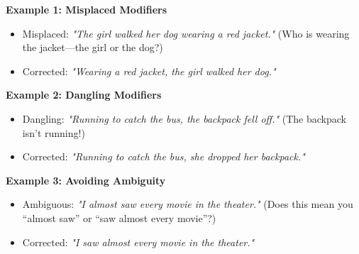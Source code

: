 \documentclass[12pt]{article}
\begin{document}
\begin{tcolorbox}[colframe=black!60, colback=white, 
coltitle=black, colbacktitle=black!15, fonttitle=\bfseries\Large, 
title=Examples, halign title=center, left=10pt, right=10pt, top=10pt, bottom=15pt]

\textbf{Example 1: Misplaced Modifiers}
\begin{itemize}
    \item Misplaced: \textit{"The girl walked her dog wearing a red jacket."}  
    (Who is wearing the jacket—the girl or the dog?)
    \item Corrected: \textit{"Wearing a red jacket, the girl walked her dog."}
\end{itemize}

\textbf{Example 2: Dangling Modifiers}
\begin{itemize}
    \item Dangling: \textit{"Running to catch the bus, the backpack fell off."}  
    (The backpack isn’t running!)
    \item Corrected: \textit{"Running to catch the bus, she dropped her backpack."}
\end{itemize}

\textbf{Example 3: Avoiding Ambiguity}
\begin{itemize}
    \item Ambiguous: \textit{"I almost saw every movie in the theater."}  
    (Does this mean you “almost saw” or “saw almost every movie”?)
    \item Corrected: \textit{"I saw almost every movie in the theater."}
\end{itemize}

\end{tcolorbox}

\vspace{1em}
\end{document}
